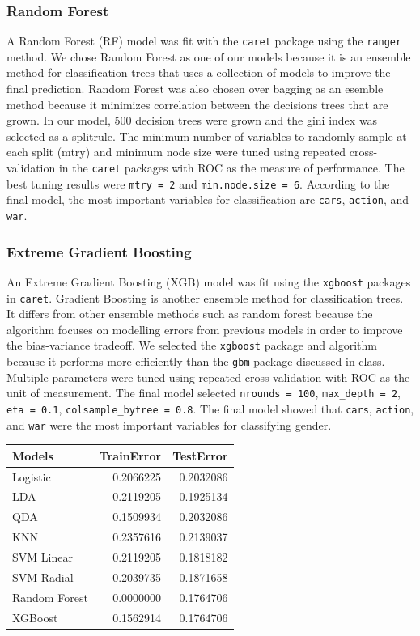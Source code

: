 \documentclass[]{article}
\begin{document}
\subsubsection{Random Forest}\label{random-forest}

A Random Forest (RF) model was fit with the \texttt{caret} package using
the \texttt{ranger} method. We chose Random Forest as one of our models
because it is an ensemble method for classification trees that uses a
collection of models to improve the final prediction. Random Forest was
also chosen over bagging as an esemble method because it minimizes
correlation between the decisions trees that are grown. In our model,
500 decision trees were grown and the gini index was selected as a
splitrule. The minimum number of variables to randomly sample at each
split (mtry) and minimum node size were tuned using repeated
cross-validation in the \texttt{caret} packages with ROC as the measure
of performance. The best tuning results were \texttt{mtry\ =\ 2} and
\texttt{min.node.size\ =\ 6}. According to the final model, the most
important variables for classification are \texttt{cars},
\texttt{action}, and \texttt{war}.

\subsubsection{Extreme Gradient
Boosting}\label{extreme-gradient-boosting}

An Extreme Gradient Boosting (XGB) model was fit using the
\texttt{xgboost} packages in \texttt{caret}. Gradient Boosting is
another ensemble method for classification trees. It differs from other
ensemble methods such as random forest because the algorithm focuses on
modelling errors from previous models in order to improve the
bias-variance tradeoff. We selected the \texttt{xgboost} package and
algorithm because it performs more efficiently than the \texttt{gbm}
package discussed in class. Multiple parameters were tuned using
repeated cross-validation with ROC as the unit of measurement. The final
model selected \texttt{nrounds\ =\ 100}, \texttt{max\_depth\ =\ 2},
\texttt{eta\ =\ 0.1}, \texttt{colsample\_bytree\ =\ 0.8}. The final
model showed that \texttt{cars}, \texttt{action}, and \texttt{war} were
the most important variables for classifying gender.

\begin{longtable}[]{@{}lrr@{}}
\toprule
Models & TrainError & TestError\tabularnewline
\midrule
\endhead
Logistic & 0.2066225 & 0.2032086\tabularnewline
LDA & 0.2119205 & 0.1925134\tabularnewline
QDA & 0.1509934 & 0.2032086\tabularnewline
KNN & 0.2357616 & 0.2139037\tabularnewline
SVM Linear & 0.2119205 & 0.1818182\tabularnewline
SVM Radial & 0.2039735 & 0.1871658\tabularnewline
Random Forest & 0.0000000 & 0.1764706\tabularnewline
XGBoost & 0.1562914 & 0.1764706\tabularnewline
\bottomrule
\end{longtable}
\end{document}
